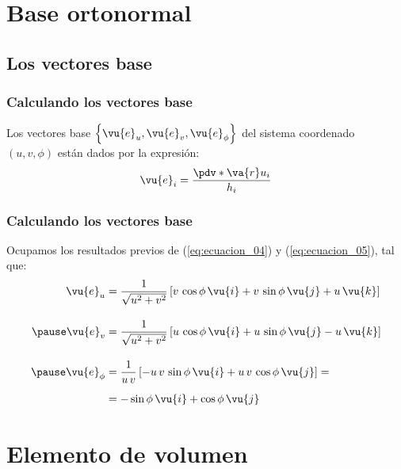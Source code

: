 \section{Base ortonormal}
\subsection{Los vectores base}
\begin{frame}
\frametitle{Calculando los vectores base}
Los vectores base $\left\{ \vu{e}_{u}, \vu{e}_{v}, \vu{e}_{\phi} \right\}$ del sistema coordenado $(u, v, \phi)$ están dados por la expresión:
\begin{align*}
\vu{e}_{i} = \dfrac{\pdv*{\va{r}}{u_{i}}}{h_{i}}
\end{align*}
\end{frame}
\begin{frame}
\frametitle{Calculando los vectores base}
Ocupamos los resultados previos de (\ref{eq:ecuacion_04}) y (\ref{eq:ecuacion_05}), tal que:
\begin{eqnarray}
\begin{aligned}
\vu{e}_{u} &= \dfrac{1}{\sqrt{u^{2} + v^{2}}} \left[ v \, \cos \phi \, \vu{i} + v \, \sin \phi \, \vu{j} + u \, \vu{k} \right] \\[1em] \pause
\vu{e}_{v} &=\dfrac{1}{\sqrt{u^{2} + v^{2}}} \left[ u \, \cos \phi \, \vu{i} + u \, \sin \phi \, \vu{j} - u \, \vu{k} \right] \\[1em] \pause
\vu{e}_{\phi} &= \dfrac{1}{u \, v} \left[- u \, v \, \sin \phi \, \vu{i} + u \, v \, \cos \phi \, \vu{j} \right]  = \\[0.5em]
&= - \sin \phi \, \vu{i} + \cos \phi \, \vu{j}
\end{aligned}
\label{eq:ecuacion_06}
\end{eqnarray}
\end{frame}
\section{Elemento de volumen}
